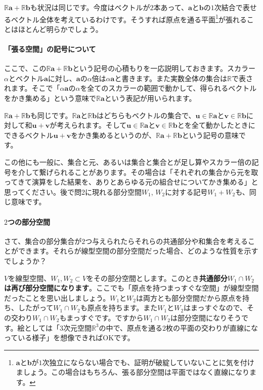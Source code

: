 $\mathbb{R}\bm{a} + \mathbb{R}\bm{b}$も状況は同じです。今度はベクトルが$2$本あって、$\bm{a}$と$\bm{b}$の$1$次結合で表せるベクトル全体を考えているわけです。そうすれば原点を通る平面\footnote{$\bm{a}$と$\bm{b}$が$1$次独立にならない場合でも、証明が破綻していないことに気を付けましょう。この場合はもちろん、張る部分空間は平面ではなく直線になります。}が張れることはほとんど明らかでしょう。

\paragraph{「張る空間」の記号について} ここで、この$\mathbb{R}\bm{a}+\mathbb{R}\bm{b}$という記号の心積もりを一応説明しておきます。スカラー$\alpha$とベクトル$\bm{a}$に対し、$\bm{a}$の$\alpha$倍は$\alpha\bm{a}$と書きます。また実数全体の集合は$\mathbb{R}$で表されます。そこで「$\alpha\bm{a}$の$\alpha$を全てのスカラーの範囲で動かして、得られるベクトルをかき集める」という意味で$\mathbb{R}\bm{a}$という表記が用いられます。

$\mathbb{R}\bm{a} + \mathbb{R}\bm{b}$も同じです。$\mathbb{R}\bm{a}$と$\mathbb{R}\bm{b}$はどちらもベクトルの集合で、$\bm{u}\in\mathbb{R}\bm{a}$と$\bm{v}\in\mathbb{R}\bm{b}$に対して和$\bm{u} + \bm{v}$が考えられます。そして$\bm{u}\in\mathbb{R}\bm{a}$と$\bm{v}\in\mathbb{R}\bm{b}$とを全て動かしたときにできるベクトル$\bm{u} + \bm{v}$をかき集めるというのが、$\mathbb{R}\bm{a} + \mathbb{R}\bm{b}$という記号の意味です。

この他にも一般に、集合と元、あるいは集合と集合とが足し算やスカラー倍の記号を介して繋げられることがあります。その場合は「それぞれの集合から元を取ってきて演算をした結果を、ありとあらゆる元の組合せについてかき集める」と思ってください。後で問2に現れる部分空間$W_1$, $W_2$に対する記号$W_1 + W_2$も、同じ意味です。

\paragraph{$2$つの部分空間} さて、集合の部分集合が$2$つ与えられたらそれらの共通部分や和集合を考えることができます。それらが線型空間の部分空間だった場合、どのような性質を示すでしょうか？

$V$を線型空間、$W_1, W_2\subset V$をその部分空間とします。このとき\textbf{共通部分$W_1 \cap W_2$は再び部分空間になります}。ここでも「原点を持つまっすぐな空間」が線型空間だったことを思い出しましょう。$W_1$と$W_2$は両方とも部分空間だから原点を持ち、したがって$W_1 \cap W_2$も原点を持ちます。また$W_1$と$W_2$はまっすぐなので、その交わり$W_1 \cap W_2$もまっすぐです。ですから$W_1 \cap W_2$は部分空間になりそうです。絵としては「$3$次元空間$\mathbb{R}^3$の中で、原点を通る$2$枚の平面の交わりが直線になっている様子」を想像できればOKです。

